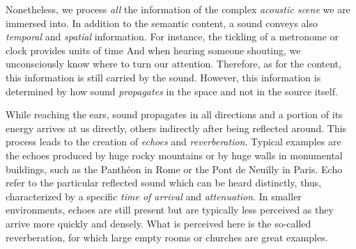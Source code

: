 
\mynewline
Nonetheless, we process \textit{all} the information of the complex \textit{acoustic scene} we are immersed into.
In addition to the semantic content, a sound conveys also \textit{temporal} and \textit{spatial} information.
For instance, the tickling of a metronome or clock provides units of time
And when hearing someone shouting, we unconsciously know where to turn our attention.
Therefore, as for the content, this information is still carried by the sound.
However, this information is determined by how sound \textit{propagates} in the space and not in the source itself.

\mynewline
While reaching the ears, sound propagates in all directions and a portion of its energy arrives at us directly, others indirectly after being reflected around.
This process leads to the creation of \textit{echoes} and \textit{reverberation}.
Typical examples are the echoes produced by huge rocky mountains or by huge walls in monumental buildings, such as the Panthéon in Rome or the Pont de Neuilly in Paris.
Echo refer to the particular reflected sound which can be heard distinctly, thus, characterized by a specific \textit{time of arrival} and \textit{attenuation}.
In smaller environments, echoes are still present but are typically less perceived as they arrive more quickly and densely.
What is perceived here is the so-called reverberation, for which large empty rooms or churches are great examples.

